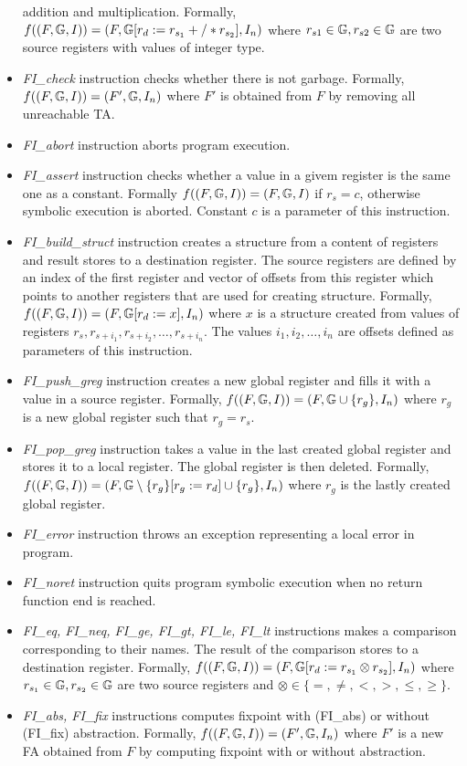 \begin{itemize}
		addition and multiplication.
		Formally, $f(\stdsym) = \symstate{F}
		{\regssub{r_d}{r_{s_1} +/* r_{s_2}}}
		{I_n}$
		where $r_{s1} \in \regs, r_{s2} \in \regs$ are two source registers
		with values of integer type.
	\item \emph{FI\_check} instruction checks whether there is not
		garbage.
		Formally, $f(\stdsym) = \symstate{F'}
		{\regs}
		{I_n}$
		where $F'$ is obtained from $F$ by removing all unreachable
		TA.
	\item \emph{FI\_abort} instruction aborts program execution.
	\item \emph{FI\_assert} instruction checks whether a value
		in a givem register is the same one as a constant.
		Formally $f(\stdsym) = \stdsym$ if $r_s = c$, otherwise
		symbolic execution is aborted.
		Constant $c$ is a parameter of this instruction.
	\item \emph{FI\_build\_struct} instruction creates a structure from a
		content of registers and result stores to a destination register.
		The source registers are defined by an index of the first register and
		vector of offsets from this register which points to another registers
		that are used for creating structure.
		Formally, $f(\stdsym) = \symstate{F}
		{\regssub{r_d}{x}}
		{I_n}$
		where $x$ is a structure created from values of registers $r_s,r_{s+i_1},r_{s+i_2}, \ldots, r_{s+i_n}$.
		The values $i_1, i_2, \ldots, i_n$ are offsets defined as parameters of this instruction.
	\item \emph{FI\_push\_greg} instruction creates a new global register
		and fills it with a value in a source register.
		Formally, $f(\stdsym) = \symstate{F}
		{\regs\cup \{r_g\}}
		{I_n}$
		where $r_g$ is a new global register such that $r_g = r_s$.
	\item \emph{FI\_pop\_greg} instruction takes a value in the last created
		global register and stores it to a local register.
		The global register is then deleted.
		Formally, $f(\stdsym) = \symstate{F}
		{\regssubmin{r_g}{r_d}{r_g} \cup \{r_g\}}
		{I_n}$
		where $r_g$ is the lastly created global register.
	\item \emph{FI\_error} instruction throws an exception representing
		a local error in program.
	\item \emph{FI\_noret} instruction quits program symbolic execution when
		no return function end is reached.
	\item \emph{FI\_eq, FI\_neq, FI\_ge, FI\_gt, FI\_le, FI\_lt} instructions
		makes a comparison corresponding to their names.
		The result of the comparison stores to a destination register.
		Formally, $f(\stdsym) = \symstate{F}
		{\regssub{r_d}{r_{s_1} \otimes r_{s_2}}}
		{I_n}$
		where $r_{s_1} \in \regs, r_{s_2} \in \regs$ are two source registers
		and $\otimes \in \{=,\neq, <,>,\leq,\geq\}$.
	\item \emph{FI\_abs, FI\_fix} instructions computes fixpoint with (FI\_abs) or
		without (FI\_fix) abstraction.
		Formally, $f(\stdsym) = \symstate{F'}
		{\regs}
		{I_n}$
		where $F'$ is a new FA obtained from $F$ by computing fixpoint with or without abstraction.

\end{itemize}


